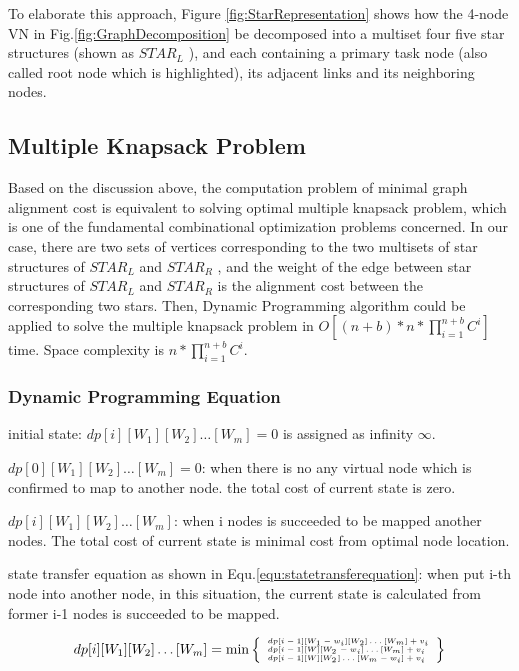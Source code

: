 To elaborate this approach, Figure \ref{fig:StarRepresentation} shows how the 4-node VN in Fig.\ref{fig:GraphDecomposition} be decomposed into a multiset four five star structures (shown as $STAR_L$ ), and each containing a primary task node (also called root node which is highlighted), its adjacent links and its neighboring nodes.

\subsection{Multiple Knapsack Problem}
Based on the discussion above, the computation problem of minimal graph alignment cost is equivalent to solving optimal multiple knapsack problem, which is one of the fundamental combinational optimization problems concerned. In our case, there are two sets of vertices corresponding to the two multisets of star structures of $STAR_L$ and $STAR_R$ , and the weight of the edge between star structures of $STAR_L$ and $STAR_R$ is the alignment cost between the corresponding two stars. Then, Dynamic Programming algorithm could be applied to solve the multiple knapsack problem in $O[(n+b)*n*\prod_{i=1}^{n+b}C^i]$ time. Space complexity is $n*\prod_{i=1}^{n+b}C^i$.


\subsubsection{Dynamic Programming Equation}
\label{lab:DynamicProgrammingEquation}
initial state: $dp[i][{W_1}][{W_2}] \ldots [{W_m}]=0$ is assigned as infinity $\infty$.

$dp[0][{W_1}][{W_2}] \ldots [{W_m}]=0$: when there is no any virtual node which is confirmed to  map to another node. the total cost of current state is zero.

$dp[i][{W_1}][{W_2}] \ldots [{W_m}] $: when  i nodes is succeeded to be mapped another nodes. The total cost of current state is minimal cost from optimal node location.

state transfer equation as shown in Equ.\ref{equ:statetransferequation}: when put i-th node into another node, in this situation, the current state is calculated from former i-1 nodes is succeeded to be mapped.

\begin{equation}
\tiny{
\label{equ:statetransferequation}
dp[i][{W_1}][{W_2}] \ldots [{W_m}] = \min \left\{ \begin{array}{l}
dp[i - 1][{W_1} - {w_i}][{W_2}] \ldots [{W_m}] + {v_i}\\
dp[i - 1][W][{W_2}_{} - {w_i}] \ldots [{W_m}] + {v_i}\\
dp[i - 1][W][{W_2}_{}] \ldots [{W_m} - {w_i}] + {v_i}
\end{array} \right\}
}
\end{equation}



